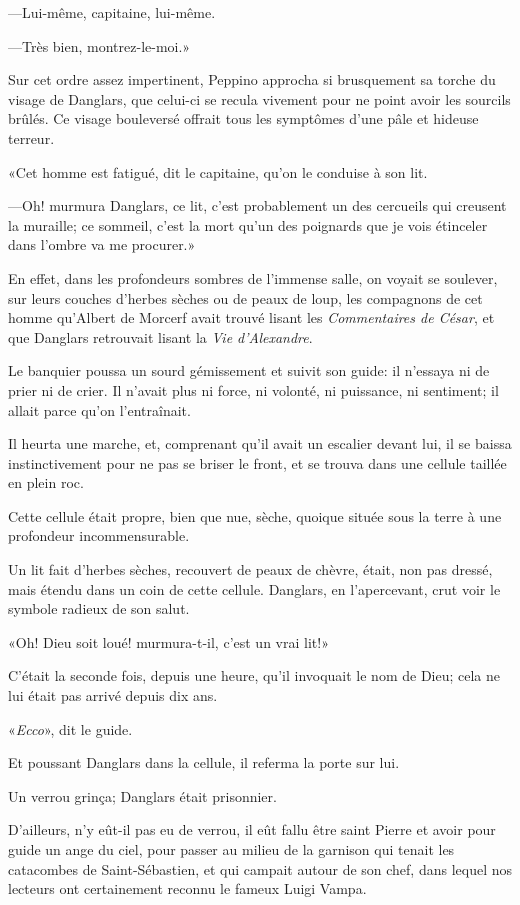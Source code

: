 —Lui-même, capitaine, lui-même. 

—Très bien, montrez-le-moi.» 

Sur cet ordre assez impertinent, Peppino approcha si brusquement sa torche du visage de Danglars, que celui-ci se recula vivement pour ne point avoir les sourcils brûlés. Ce visage bouleversé offrait tous les symptômes d'une pâle et hideuse terreur. 

«Cet homme est fatigué, dit le capitaine, qu'on le conduise à son lit. 

—Oh! murmura Danglars, ce lit, c'est probablement un des cercueils qui creusent la muraille; ce sommeil, c'est la mort qu'un des poignards que je vois étinceler dans l'ombre va me procurer.» 

En effet, dans les profondeurs sombres de l'immense salle, on voyait se soulever, sur leurs couches d'herbes sèches ou de peaux de loup, les compagnons de cet homme qu'Albert de Morcerf avait trouvé lisant les \textit{Commentaires de César}, et que Danglars retrouvait lisant la \textit{Vie d'Alexandre}. 

Le banquier poussa un sourd gémissement et suivit son guide: il n'essaya ni de prier ni de crier. Il n'avait plus ni force, ni volonté, ni puissance, ni sentiment; il allait parce qu'on l'entraînait. 

Il heurta une marche, et, comprenant qu'il avait un escalier devant lui, il se baissa instinctivement pour ne pas se briser le front, et se trouva dans une cellule taillée en plein roc. 

Cette cellule était propre, bien que nue, sèche, quoique située sous la terre à une profondeur incommensurable. 

Un lit fait d'herbes sèches, recouvert de peaux de chèvre, était, non pas dressé, mais étendu dans un coin de cette cellule. Danglars, en l'apercevant, crut voir le symbole radieux de son salut. 

«Oh! Dieu soit loué! murmura-t-il, c'est un vrai lit!» 

C'était la seconde fois, depuis une heure, qu'il invoquait le nom de Dieu; cela ne lui était pas arrivé depuis dix ans. 

«\textit{Ecco}», dit le guide. 

Et poussant Danglars dans la cellule, il referma la porte sur lui. 

Un verrou grinça; Danglars était prisonnier. 

D'ailleurs, n'y eût-il pas eu de verrou, il eût fallu être saint Pierre et avoir pour guide un ange du ciel, pour passer au milieu de la garnison qui tenait les catacombes de Saint-Sébastien, et qui campait autour de son chef, dans lequel nos lecteurs ont certainement reconnu le fameux Luigi Vampa. 

